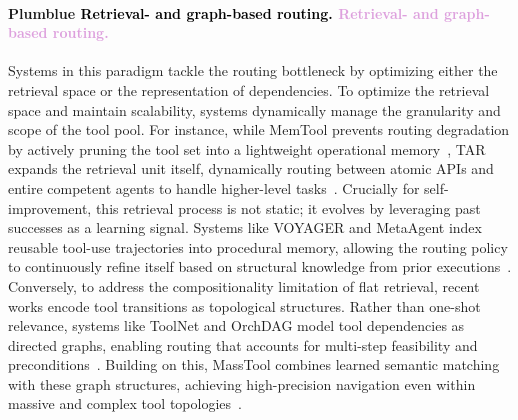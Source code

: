 \documentclass{article}
\let\oldtextcolor\textcolor
\renewcommand{\textcolor}[2]{
  \def\temp{#1}
  \def\red{blue}
  \ifx\temp\red
    \oldtextcolor{black}{#2}
  \else
    \oldtextcolor{#1}{#2}
  \fi
}
\begin{document}
\paragraph{\textcolor{Plum}{Retrieval- and graph-based routing.}}
Systems in this paradigm tackle the routing bottleneck by optimizing either the retrieval space or the representation of dependencies. To optimize the retrieval space and maintain scalability, systems dynamically manage the granularity and scope of the tool pool. For instance, while MemTool prevents routing degradation by actively pruning the tool set into a lightweight operational memory~\citep{lumer2025memtooloptimizingshorttermmemory}, TAR expands the retrieval unit itself, dynamically routing between atomic APIs and entire competent agents to handle higher-level tasks~\citep{lumer2025tooltoagentretrievalbridgingtools}. Crucially for self-improvement, this retrieval process is not static; it evolves by leveraging past successes as a learning signal. Systems like VOYAGER and MetaAgent index reusable tool-use trajectories into procedural memory, allowing the routing policy to continuously refine itself based on structural knowledge from prior executions~\citep{wang2023voyageropenendedembodiedagent, qian2025metaagentselfevolvingagenttool}. Conversely, to address the compositionality limitation of flat retrieval, recent works encode tool transitions as topological structures. Rather than one-shot relevance, systems like ToolNet and OrchDAG model tool dependencies as directed graphs, enabling routing that accounts for multi-step feasibility and preconditions~\citep{liu2024toolnetconnectinglargelanguage, lu2025orchdagcomplextoolorchestration}. Building on this, MassTool combines learned semantic matching with these graph structures, achieving high-precision navigation even within massive and complex tool topologies~\citep{lin2025masstoolmultitasksearchbasedtool}.
\end{document}

